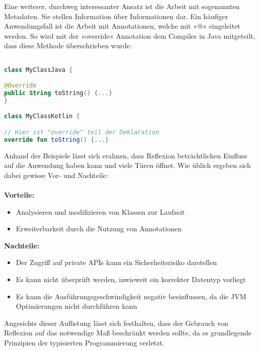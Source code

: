 \bigskip
Eine weiterer, durchweg interessanter Ansatz ist die Arbeit mit sogenannten Metadaten. Sie stellen Information über Informationen dar. Ein häufiger Anwendungsfall ist die Arbeit mit Annotationen, welche mit »@« eingeleitet werden. So wird mit der »override« Annotation dem Compiler in Java mitgeteilt, dass diese Methode überschrieben wurde:
\begin{lstlisting}[caption={Override Annotation}, label={lst:data-class}, language=Kotlin]

class MyClassJava {

@Override
public String toString() {...}
}

class MyClassKotlin {

// Hier ist "override" teil der Deklaration
override fun toString() {...}
\end{lstlisting}
\bigskip
Anhand der Beispiele lässt sich erahnen, dass Reflexion beträchtlichen Einfluss auf die Anwendung haben kann und viele Türen öffnet. Wie üblich ergeben sich dabei gewisse Vor- und Nachteile:
\\
\\
\textbf{Vorteile:}
\begin{itemize}
	\item Analysieren und modifizieren von Klassen zur Laufzeit
	\item Erweiterbarkeit durch die Nutzung von Annotationen 
\end{itemize}
\textbf{Nachteile:}
\begin{itemize}
	\item Der Zugriff auf private APIs kann ein Sicherheitsrisiko darstellen
	\item Es kann nicht überprüft werden, inwieweit ein korrekter Datentyp vorliegt
	\item Es kann die Ausführungsgeschwindigkeit negativ beeinflussen, da die JVM Optimierungen nicht durchführen kann 
\end{itemize}
Angesichts dieser Auflistung lässt sich festhalten, dass der Gebrauch von Reflexion auf das notwendige Maß beschränkt werden sollte, da es grundlegende Prinzipien der typisierten Programmierung verletzt.

